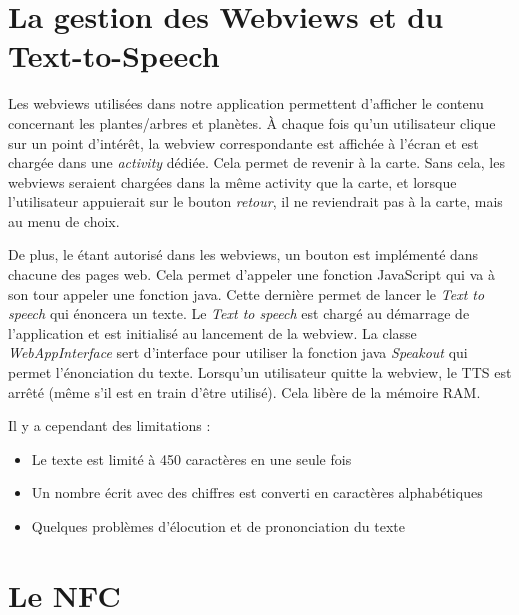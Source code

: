 \documentclass[a4paper,11pt]{article}
\begin{document}
		\section{La gestion des Webviews et du Text-to-Speech}
		Les webviews utilisées dans notre application permettent d'afficher le contenu concernant les plantes/arbres et planètes. À chaque fois qu'un utilisateur clique sur un point d'intérêt, la webview correspondante est affichée à l'écran et est chargée dans une \emph{activity} dédiée. Cela permet de revenir à la carte. Sans cela, les webviews seraient chargées dans la même activity que la carte, et lorsque l'utilisateur appuierait sur le bouton \emph{retour}, il ne reviendrait pas à la carte, mais au menu de choix.
		
		De plus, le étant autorisé dans les webviews, un bouton est implémenté dans chacune des pages web. Cela permet d'appeler une fonction JavaScript qui va à son tour appeler une fonction java. Cette dernière permet de lancer le \emph{Text to speech} qui énoncera un texte.
		Le \emph{Text to speech} est chargé au démarrage de l’application et est initialisé au lancement de la webview. La classe \emph{WebAppInterface} sert d'interface pour utiliser la fonction java \emph{Speakout} qui permet l'énonciation du texte. Lorsqu'un utilisateur quitte la webview, le TTS est arrêté (même s'il est en train d'être utilisé). Cela libère de la mémoire RAM.
		
		Il y a cependant des limitations :
		\begin{itemize}
		\item Le texte est limité à 450 caractères en une seule fois
		\item Un nombre écrit avec des chiffres est converti en caractères alphabétiques
		\item Quelques problèmes d'élocution et de prononciation du texte
		 
		\end{itemize}
    \newpage
    \section{Le NFC}
\end{document}
